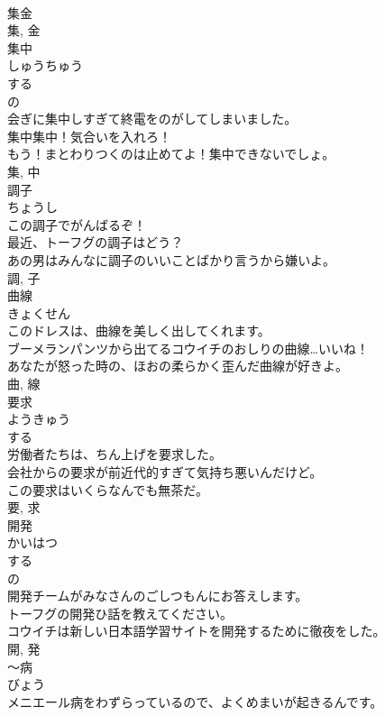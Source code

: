 \documentclass[8pt]{extreport}
\begin{document}
\begin{CJK}{UTF8}{min}
\\	集金 
\\	集, 金	
\\	集中	
\\	しゅうちゅう	
\\	する 
\\	の 
\\	会ぎに集中しすぎて終電をのがしてしまいました。	
\\	集中集中！気合いを入れろ！	
\\	もう！まとわりつくのは止めてよ！集中できないでしょ。	
\\	集, 中	
\\	調子	
\\	ちょうし	
\\	この調子でがんばるぞ！	
\\	最近、トーフグの調子はどう？	
\\	あの男はみんなに調子のいいことばかり言うから嫌いよ。	
\\	調, 子	
\\	曲線	
\\	きょくせん	
\\	このドレスは、曲線を美しく出してくれます。	
\\	ブーメランパンツから出てるコウイチのおしりの曲線…いいね！	
\\	あなたが怒った時の、ほおの柔らかく歪んだ曲線が好きよ。	
\\	曲, 線	
\\	要求	
\\	ようきゅう	
\\	する 
\\	労働者たちは、ちん上げを要求した。	
\\	会社からの要求が前近代的すぎて気持ち悪いんだけど。	
\\	この要求はいくらなんでも無茶だ。	
\\	要, 求	
\\	開発	
\\	かいはつ	
\\	する 
\\	の 
\\	開発チームがみなさんのごしつもんにお答えします。	
\\	トーフグの開発ひ話を教えてください。	
\\	コウイチは新しい日本語学習サイトを開発するために徹夜をした。	
\\	開, 発	
\\	〜病	
\\	びょう	
\\	メニエール病をわずらっているので、よくめまいが起きるんです。	

\end{CJK}
\end{document}
